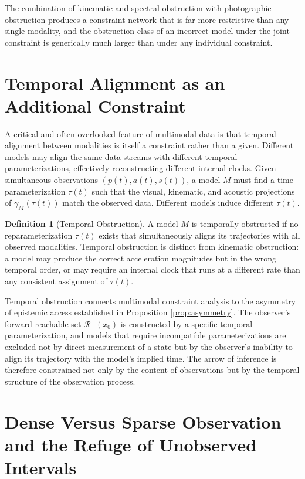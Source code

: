 \documentclass[12pt, a4paper, oneside]{article}
\theoremstyle{plain}
\theoremstyle{definition}
\newtheorem{definition}[theorem]{Definition}
\theoremstyle{remark}
\newcommand{\R}{\mathcal{R}}
\begin{document}
The combination of kinematic and spectral obstruction with photographic obstruction produces a constraint network that is far more restrictive than any single modality, and the obstruction class of an incorrect model under the joint constraint is generically much larger than under any individual constraint.

\section{Temporal Alignment as an Additional Constraint}

A critical and often overlooked feature of multimodal data is that temporal alignment between modalities is itself a constraint rather than a given. Different models may align the same data streams with different temporal parameterizations, effectively reconstructing different internal clocks. Given simultaneous observations $(p(t), a(t), s(t))$, a model $M$ must find a time parameterization $\tau(t)$ such that the visual, kinematic, and acoustic projections of $\gamma_M(\tau(t))$ match the observed data. Different models induce different $\tau(t)$.

\begin{definition}[Temporal Obstruction]
A model $M$ is temporally obstructed if no reparameterization $\tau(t)$ exists that simultaneously aligns its trajectories with all observed modalities. Temporal obstruction is distinct from kinematic obstruction: a model may produce the correct acceleration magnitudes but in the wrong temporal order, or may require an internal clock that runs at a different rate than any consistent assignment of $\tau(t)$.
\end{definition}

Temporal obstruction connects multimodal constraint analysis to the asymmetry of epistemic access established in Proposition \ref{prop:asymmetry}. The observer's forward reachable set $\R^+(x_0)$ is constructed by a specific temporal parameterization, and models that require incompatible parameterizations are excluded not by direct measurement of a state but by the observer's inability to align its trajectory with the model's implied time. The arrow of inference is therefore constrained not only by the content of observations but by the temporal structure of the observation process.

\section{Dense Versus Sparse Observation and the Refuge of Unobserved Intervals}
\end{document}
